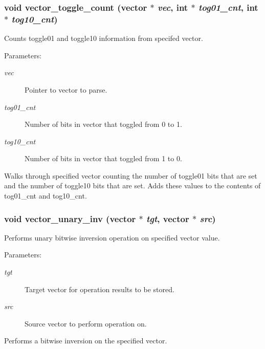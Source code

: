 \subsubsection{\setlength{\rightskip}{0pt plus 5cm}void vector\_\-toggle\_\-count ({\bf vector} $\ast$ {\em vec}, int $\ast$ {\em tog01\_\-cnt}, int $\ast$ {\em tog10\_\-cnt})}\label{vector_8h_a20}


Counts toggle01 and toggle10 information from specifed vector.

\begin{Desc}
\item[Parameters: ]\par
\begin{description}
\item[{\em 
vec}]Pointer to vector to parse. \item[{\em 
tog01\_\-cnt}]Number of bits in vector that toggled from 0 to 1. \item[{\em 
tog10\_\-cnt}]Number of bits in vector that toggled from 1 to 0.\end{description}
\end{Desc}
Walks through specified vector counting the number of toggle01 bits that are set and the number of toggle10 bits that are set. Adds these values to the contents of tog01\_\-cnt and tog10\_\-cnt. 
\subsubsection{\setlength{\rightskip}{0pt plus 5cm}void vector\_\-unary\_\-inv ({\bf vector} $\ast$ {\em tgt}, {\bf vector} $\ast$ {\em src})}\label{vector_8h_a29}


Performs unary bitwise inversion operation on specified vector value.

\begin{Desc}
\item[Parameters: ]\par
\begin{description}
\item[{\em 
tgt}]Target vector for operation results to be stored. \item[{\em 
src}]Source vector to perform operation on.\end{description}
\end{Desc}
Performs a bitwise inversion on the specified vector. 

